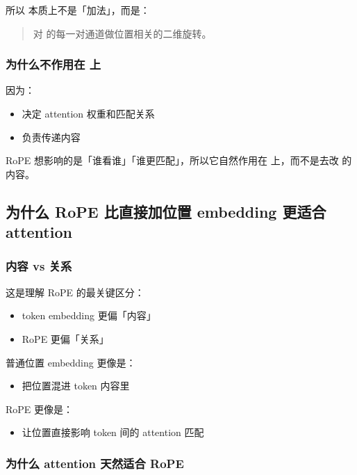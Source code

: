 所以  本质上不是「加法」，而是：

\begin{quote}
对  的每一对通道做位置相关的二维旋转。
\end{quote}

\subsubsection{为什么不作用在  上}

因为：

\begin{itemize}[leftmargin=1.5em]
  \item {} 决定 attention 权重和匹配关系
  \item {} 负责传递内容
\end{itemize}

RoPE 想影响的是「谁看谁」「谁更匹配」，所以它自然作用在  上，而不是去改  的内容。

\subsection{为什么 RoPE 比直接加位置 embedding 更适合 attention}

\subsubsection{内容 vs 关系}

这是理解 RoPE 的最关键区分：

\begin{itemize}[leftmargin=1.5em]
  \item token embedding 更偏「内容」
  \item RoPE 更偏「关系」
\end{itemize}

普通位置 embedding 更像是：
\begin{itemize}[leftmargin=1.5em]
  \item 把位置混进 token 内容里
\end{itemize}

RoPE 更像是：
\begin{itemize}[leftmargin=1.5em]
  \item 让位置直接影响 token 间的 attention 匹配
\end{itemize}

\subsubsection{为什么 attention 天然适合 RoPE}


